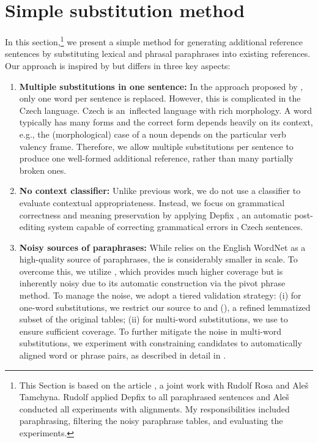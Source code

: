 \section{Simple substitution method}
\label{substitution}
In this section,\footnote{This Section is based on the article \citep{barancikova:2014}, a joint work with Rudolf Rosa and Aleš Tamchyna. Rudolf applied Depfix to all paraphrased sentences and Aleš conducted all experiments with alignments. My responsibilities included paraphrasing, filtering the noisy paraphrase tables, and evaluating the experiments.} we present a simple method for generating additional reference sentences by substituting lexical and phrasal paraphrases into existing references. Our approach is inspired by \citet{kauchak} but differs in three key aspects:
 
\begin{enumerate}
\item \textbf{Multiple substitutions in one sentence:} In the approach proposed by \cite{kauchak}, only one word per sentence is replaced. However, this is complicated in the Czech language. Czech is an~inflected language with rich morphology. A word typically has many forms and the correct form depends heavily on its context, e.g., the (morphological) case of a noun depends on the particular verb valency frame. Therefore, we allow multiple substitutions per sentence to produce one well-formed additional reference, rather than many partially broken ones.

\item \textbf{No context classifier:} Unlike previous work, we do not use a classifier to evaluate  contextual appropriateness. Instead, we focus on grammatical correctness and meaning preservation by applying Depfix \citep{depfix}, an automatic post-editing system capable of correcting grammatical errors in Czech sentences.

\item \textbf{Noisy sources of paraphrases:} While \citeauthor{kauchak} relies on the English WordNet as a high-quality source of paraphrases, the \wordnet{} \citep{czech-wordnet} is considerably smaller in scale. To overcome this, we utilize \cmt \citep{meteor-wmt:2011}, which provides much higher coverage but is inherently noisy due to its automatic construction via the pivot phrase method. 
To manage the noise, we adopt a tiered validation strategy: 
(i) for one-word substitutions, we restrict our source to \wordnet and \fm (), a refined lemmatized subset of the original tables;
(ii) for multi-word substitutions, we use \cmpt to ensure sufficient coverage. 
To further mitigate the noise in multi-word substitutions, we experiment with constraining candidates to automatically aligned word or phrase pairs, as described in detail in .
\end{enumerate}

